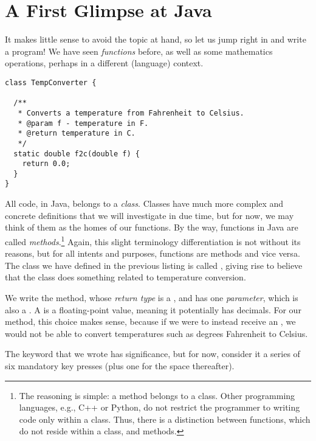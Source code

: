 \section{A First Glimpse at Java}
It makes little sense to avoid the topic at hand, so let us jump right in and write a program! We have seen \emph{functions} before, as well as some mathematics operations, perhaps in a different (language) context. 


\begin{lstlisting}[language=MyJava]
class TempConverter {
  
  /**
   * Converts a temperature from Fahrenheit to Celsius.
   * @param f - temperature in F.
   * @return temperature in C.
   */
  static double f2c(double f) {
    return 0.0;
  }
}
\end{lstlisting}

All code, in Java, belongs to a \emph{class}. Classes have much more complex and concrete definitions that we will investigate in due time, but for now, we may think of them as the homes of our functions. By the way, functions in Java are called \emph{methods}.\footnote{The reasoning is simple: a method belongs to a class. Other programming languages, e.g., C++ or Python, do not restrict the programmer to writing code only within a class. Thus, there is a distinction between functions, which do not reside within a class, and methods.} Again, this slight terminology differentiation is not without its reasons, but for all intents and purposes, functions are methods and vice versa. The class we have defined in the previous listing is called , giving rise to believe that the class does something related to temperature conversion.

We write the  method, whose \emph{return type} is a , and has one \emph{parameter}, which is also a . A  is a floating-point value, meaning it potentially has decimals. For our method, this choice makes sense, because if we were to instead receive an , we would not be able to convert temperatures such as  degrees Fahrenheit to Celsius. 

The  keyword that we wrote has significance, but for now, consider it a series of six mandatory key presses (plus one for the space thereafter).

